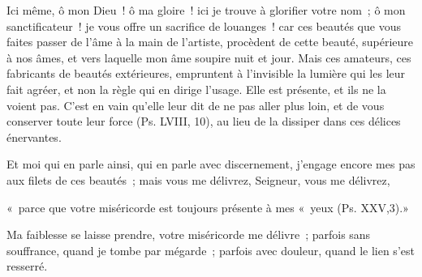 \documentclass[french,twoside]{book} %
\newenvironment{quoteblock}%
  {\begin{quoting}}
  {\end{quoting}}
\newenvironment{quotebar}{%
    \def\FrameCommand{{\color{rubric!10!}\vrule width 0.5em} \hspace{0.9em}}%
    \def\OuterFrameSep{\itemsep} %
    \MakeFramed {\advance\hsize-\width \FrameRestore}
  }%
  {%
    \endMakeFramed
  }
\renewenvironment{quoteblock}%
  {%
    \savenotes
    \setstretch{0.9}
    \normalfont
    \begin{quotebar}
  }
  {%
    \end{quotebar}
    \spewnotes
  }
\begin{document}
Ici même, ô mon Dieu ! ô ma gloire ! ici je trouve à glorifier votre nom ; ô mon sanctificateur ! je vous offre un sacrifice de louanges ! car ces beautés que vous faites passer de l’âme à la main de l’artiste, procèdent de cette beauté, supérieure à nos âmes, et vers laquelle mon âme soupire nuit et jour. Mais ces amateurs, ces fabricants de beautés extérieures, empruntent à l’invisible la lumière qui les leur fait agréer, et non la règle qui en dirige l’usage. Elle est présente, et ils ne la voient pas. C’est en vain qu’elle leur dit de ne pas aller plus loin, et de vous conserver toute leur force (Ps. LVIII, 10), au lieu de la dissiper dans ces délices énervantes.\par
Et moi qui en parle ainsi, qui en parle avec discernement, j’engage encore mes pas aux filets de ces beautés ; mais vous me délivrez, Seigneur, vous me délivrez,\par

\begin{quoteblock}
\noindent « parce que votre miséricorde est toujours présente à mes « yeux (Ps. XXV,3).»\end{quoteblock}

\noindent Ma faiblesse se laisse prendre, votre miséricorde me délivre ; parfois sans souffrance, quand je tombe par mégarde ; parfois avec douleur, quand le lien s’est resserré.
\end{document}
